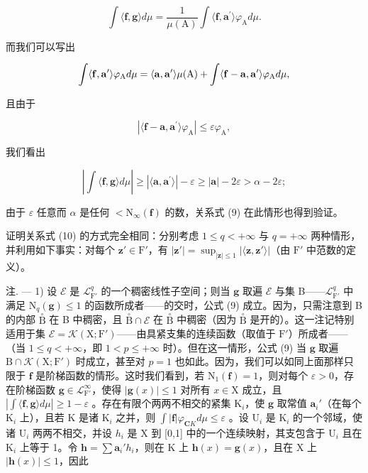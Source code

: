 \[
\int \langle \mathbf {f}, \mathbf {g} \rangle d \mu = \frac {1}{\mu (\mathrm{A})} \int \langle \mathbf {f}, \mathbf {a} ^ {\prime} \rangle \varphi_ {\mathrm{A}} d \mu .
\]

而我们可以写出

\[
\int \langle {\bf f}, {\bf a} ^ {\prime} \rangle \varphi_ {\mathrm{A}} d \mu = \langle {\bf a}, {\bf a} ^ {\prime} \rangle \mu (\mathrm{A}) + \int \langle {\bf f} - {\bf a}, {\bf a} ^ {\prime} \rangle \varphi_ {\mathrm{A}} d \mu ,
\]

且由于

\[
\left| \langle \mathbf {f} - \mathbf {a}, \mathbf {a} ^ {\prime} \rangle \varphi_ {\mathrm{A}} \right| \leqslant \varepsilon \varphi_ {\mathrm{A}},
\]

我们看出

\[
\left| \int \langle \mathbf {f}, \mathbf {g} \rangle d \mu \right| \geqslant | \langle \mathbf {a}, \mathbf {a} ^ {\prime} \rangle | - \varepsilon \geqslant | \mathbf {a} | - 2 \varepsilon > \alpha - 2 \varepsilon ;
\]

由于 \(\varepsilon\) 任意而 \(\alpha\) 是任何 \(<\mathrm{N}_{\infty}(\mathbf{f})\) 的数，关系式 (9) 在此情形也得到验证。

证明关系式 (10) 的方式完全相同：分别考虑 \(1 \leqslant q < +\infty\) 与 \(q = +\infty\) 两种情形，并利用如下事实：对每个 \(\mathbf{z}' \in \mathrm{F}'\)，有 \(|\mathbf{z}'| = \sup_{|\mathbf{z}| \leqslant 1} |\langle \mathbf{z}, \mathbf{z}' \rangle|\)（由 \(\mathrm{F}'\) 中范数的定义）。

注. --- 1) 设 \(\mathcal{E}\) 是 \(\mathcal{L}_{\mathrm{F}'}^q\) 的一个稠密线性子空间；则当 \(\mathbf{g}\) 取遍 \(\mathcal{E}\) 与集 B——\(\mathcal{L}_{\mathrm{F}'}^q\) 中满足 \(\mathrm{N}_q(\mathbf{g}) \leqslant 1\) 的函数所成者——的交时，公式 (9) 成立。因为，只需注意到 B 的内部 \(\overset{\circ}{\mathrm{B}}\) 在 B 中稠密，且 \(\overset{\circ}{\mathrm{B}} \cap \mathcal{E}\) 在 \(\overset{\circ}{\mathrm{B}}\) 中稠密（因为 \(\overset{\circ}{\mathrm{B}}\) 是开的）。这一注记特别适用于集 \(\mathcal{E} = \mathcal{K}(\mathrm{X};\mathrm{F}')\)——由具紧支集的连续函数（取值于 \(\mathrm{F}'\)）所成者——（当 \(1 \leqslant q < +\infty\)，即 \(1 < p \leqslant +\infty\) 时）。但在这一情形，公式 (9) 当 \(\mathbf{g}\) 取遍 \(\mathrm{B} \cap \mathcal{K}(\mathrm{X};\mathrm{F}')\) 时成立，甚至对 \(p = 1\) 也如此。因为，我们可以如同上面那样只限于 \(\mathbf{f}\) 是阶梯函数的情形。这时我们看到，若 \(\mathrm{N}_1(\mathbf{f}) = 1\)，则对每个 \(\varepsilon > 0\)，存在阶梯函数 \(\mathbf{g} \in \mathcal{L}_{\mathrm{F}'}^{\infty}\)，使得 \(|\mathbf{g}(x)| \leqslant 1\) 对所有 \(x \in \mathrm{X}\) 成立，且 \(|\int \langle \mathbf{f},\mathbf{g}\rangle d\mu| \geqslant 1 - \varepsilon\) 。存在有限个两两不相交的紧集 \(\mathrm{K}_i\)，使 \(\mathbf{g}\) 取常值 \(\mathbf{a}_i'\)（在每个 \(\mathrm{K}_i\) 上），且若 K 是诸 \(\mathrm{K}_i\) 之并，则 \(\int |\mathbf{f}| \varphi_{\mathbf{C} K} d\mu \leqslant \varepsilon\) 。设 \(\mathrm{U}_i\) 是 \(\mathrm{K}_i\) 的一个邻域，使诸 \(\mathrm{U}_i\) 两两不相交，并设 \(h_i\) 是 X 到 {[}0,1{]} 中的一个连续映射，其支包含于 \(\mathrm{U}_i\) 且在 \(\mathrm{K}_i\) 上等于 1。令 \(\mathbf{h} = \sum \mathbf{a}_i' h_i\)，则在 K 上 \(\mathbf{h}(x) = \mathbf{g}(x)\)，且在 X 上 \(|\mathbf{h}(x)| \leqslant 1\)，因此

